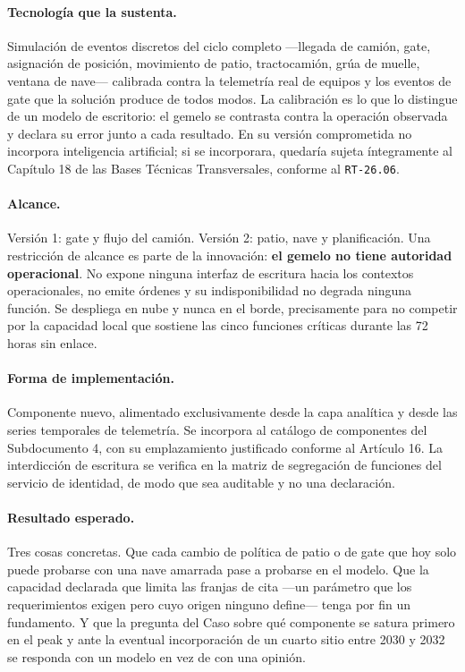 \paragraph*{Tecnología que la sustenta.}
Simulación de eventos discretos del ciclo completo —llegada de camión, gate,
asignación de posición, movimiento de patio, tractocamión, grúa de muelle,
ventana de nave— calibrada contra la telemetría real de equipos y los eventos
de gate que la solución produce de todos modos. La calibración es lo que lo
distingue de un modelo de escritorio: el gemelo se contrasta contra la
operación observada y declara su error junto a cada resultado. En su versión
comprometida no incorpora inteligencia artificial; si se incorporara, quedaría
sujeta íntegramente al Capítulo 18 de las Bases Técnicas Transversales,
conforme al \texttt{RT-26.06}.

\paragraph*{Alcance.}
Versión 1: gate y flujo del camión. Versión 2: patio, nave y planificación.
Una restricción de alcance es parte de la innovación: \textbf{el gemelo no
tiene autoridad operacional}. No expone ninguna interfaz de escritura hacia los
contextos operacionales, no emite órdenes y su indisponibilidad no degrada
ninguna función. Se despliega en nube y nunca en el borde, precisamente para no
competir por la capacidad local que sostiene las cinco funciones críticas
durante las 72 horas sin enlace.

\paragraph*{Forma de implementación.}
Componente nuevo, alimentado exclusivamente desde la capa analítica y desde las
series temporales de telemetría. Se incorpora al catálogo de componentes del
Subdocumento 4, con su emplazamiento justificado conforme al Artículo
16\textdegree{}. La interdicción de escritura se verifica en la matriz de
segregación de funciones del servicio de identidad, de modo que sea auditable y
no una declaración.

\paragraph*{Resultado esperado.}
Tres cosas concretas. Que cada cambio de política de patio o de gate que hoy
solo puede probarse con una nave amarrada pase a probarse en el modelo. Que la
capacidad declarada que limita las franjas de cita —un parámetro que los
requerimientos exigen pero cuyo origen ninguno define— tenga por fin un
fundamento. Y que la pregunta del Caso sobre qué componente se satura primero
en el peak y ante la eventual incorporación de un cuarto sitio entre 2030 y
2032 se responda con un modelo en vez de con una opinión.

